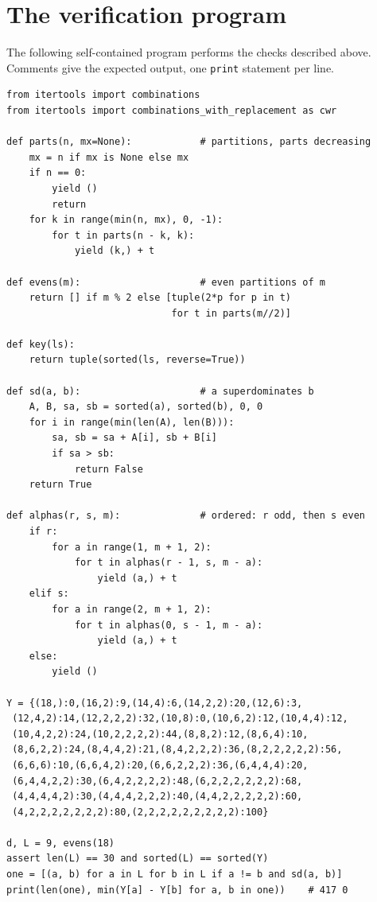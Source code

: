 \documentclass[11pt]{amsart}
\begin{document}
\appendix

\section{The verification program}\label{app:code}

The following self-contained program performs the checks described
above. Comments give the expected output, one
\texttt{print} statement per line.

{\small
\begin{verbatim}
from itertools import combinations
from itertools import combinations_with_replacement as cwr

def parts(n, mx=None):            # partitions, parts decreasing
    mx = n if mx is None else mx
    if n == 0:
        yield ()
        return
    for k in range(min(n, mx), 0, -1):
        for t in parts(n - k, k):
            yield (k,) + t

def evens(m):                     # even partitions of m
    return [] if m % 2 else [tuple(2*p for p in t)
                             for t in parts(m//2)]

def key(ls):
    return tuple(sorted(ls, reverse=True))

def sd(a, b):                     # a superdominates b
    A, B, sa, sb = sorted(a), sorted(b), 0, 0
    for i in range(min(len(A), len(B))):
        sa, sb = sa + A[i], sb + B[i]
        if sa > sb:
            return False
    return True

def alphas(r, s, m):              # ordered: r odd, then s even
    if r:
        for a in range(1, m + 1, 2):
            for t in alphas(r - 1, s, m - a):
                yield (a,) + t
    elif s:
        for a in range(2, m + 1, 2):
            for t in alphas(0, s - 1, m - a):
                yield (a,) + t
    else:
        yield ()

Y = {(18,):0,(16,2):9,(14,4):6,(14,2,2):20,(12,6):3,
 (12,4,2):14,(12,2,2,2):32,(10,8):0,(10,6,2):12,(10,4,4):12,
 (10,4,2,2):24,(10,2,2,2,2):44,(8,8,2):12,(8,6,4):10,
 (8,6,2,2):24,(8,4,4,2):21,(8,4,2,2,2):36,(8,2,2,2,2,2):56,
 (6,6,6):10,(6,6,4,2):20,(6,6,2,2,2):36,(6,4,4,4):20,
 (6,4,4,2,2):30,(6,4,2,2,2,2):48,(6,2,2,2,2,2,2):68,
 (4,4,4,4,2):30,(4,4,4,2,2,2):40,(4,4,2,2,2,2,2):60,
 (4,2,2,2,2,2,2,2):80,(2,2,2,2,2,2,2,2,2):100}

d, L = 9, evens(18)
assert len(L) == 30 and sorted(L) == sorted(Y)
one = [(a, b) for a in L for b in L if a != b and sd(a, b)]
print(len(one), min(Y[a] - Y[b] for a, b in one))    # 417 0


\end{verbatim}}
\end{document}
